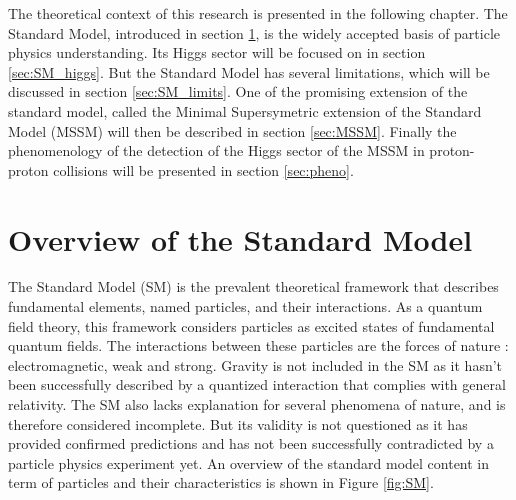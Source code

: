 




The theoretical context of this research is presented in the following chapter. The Standard Model, introduced in section \ref{sec:SM}, is the widely accepted basis of particle physics understanding. Its Higgs sector will be focused on in section \ref{sec:SM_higgs}. But the Standard Model has several limitations, which will be discussed in section \ref{sec:SM_limits}. One of the promising extension of the standard model, called the Minimal Supersymetric extension of the Standard Model (MSSM) will then be described in section \ref{sec:MSSM}. Finally the phenomenology of the detection of the Higgs sector of the MSSM in proton-proton collisions will be presented in section \ref{sec:pheno}.

\section{Overview of the Standard Model}
\label{sec:SM}
The Standard Model (SM) is the prevalent theoretical framework that describes fundamental elements, named particles, and their interactions. As a quantum field theory, this framework considers particles as excited states of fundamental quantum fields. The interactions between these particles are the forces of nature : electromagnetic, weak and strong. Gravity is not included in the SM as it hasn't been successfully described by a quantized interaction that complies with general relativity. The SM also lacks explanation for several phenomena of nature, and is therefore considered incomplete. But its validity is not questioned as it has provided confirmed predictions and has not been successfully contradicted by a particle physics experiment yet. An overview of the standard model content in term of particles and their characteristics is shown in Figure \ref{fig:SM}.\newline

